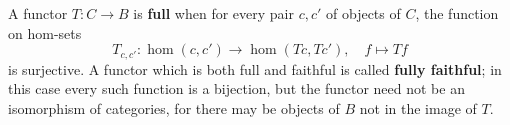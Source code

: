 A functor $T: C \rightarrow B$ is \textbf{full} when for every pair $c, c'$ of objects of $C$, the function on hom-sets
$$T_{c, c'}: \hom(c, c') \rightarrow \hom(Tc, Tc'), \quad f \mapsto Tf$$
is surjective. A functor which is both full and faithful is called \textbf{fully faithful}; in this case every such function is a bijection, but the functor need not be an isomorphism of categories, for there may be objects of $B$ not in the image of $T$.
